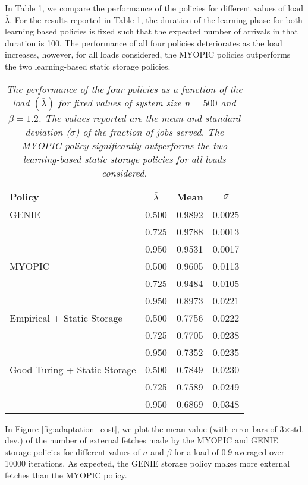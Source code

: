 \documentclass[10pt, conference, letterpaper]{IEEEtran}
\begin{document}
In Table \ref{table:diff_load}, we compare the performance of the policies for different values of load $\bar{\lambda}$. For the results reported in Table \ref{table:diff_load}, the duration of the learning phase for both learning based policies is fixed such that the expected number of arrivals in that duration is 100. The performance of all four policies deteriorates as the load increases, however, for all loads considered, the MYOPIC policies outperforms the two learning-based static storage policies.

\begin{table}[h]
	\centering
	\begin{tabular}{l c c c }
		\hline\hline
		Policy & $\bar{\lambda}$ & Mean & $\sigma$ \\ [0.5ex] \hline GENIE & 0.500 & 0.9892 & 0.0025 \\
		& 0.725 & 0.9788 & 0.0013 \\
		& 0.950 & 0.9531 & 0.0017 \\
		\hline
		MYOPIC & 0.500 & 0.9605 & 0.0113 \\
		& 0.725 & 0.9484 & 0.0105 \\
		& 0.950 & 0.8973 & 0.0221 \\
		\hline
		Empirical + Static Storage & 0.500 & 0.7756 & 0.0222  \\
		& 0.725 & 0.7705 & 0.0238 \\
		& 0.950 & 0.7352 & 0.0235 \\
		\hline
		Good Turing + Static Storage & 0.500 & 0.7849 & 0.0230  \\
		& 0.725 & 0.7589 & 0.0249 \\
		& 0.950 & 0.6869 & 0.0348 \\
		\hline
	\end{tabular}
	\caption{\sl The performance of the four policies as a function of the load $(\bar{\lambda})$ for fixed values of system size $n = 500$ and $\beta = 1.2$. The values reported are the mean and standard deviation ($\sigma$) of the fraction of jobs served. The MYOPIC policy significantly outperforms the two learning-based static storage policies for all loads considered.}
	
	\label{table:diff_load} \end{table}


In Figure \ref{fig:adaptation_cost}, we plot the mean value (with error bars of 3$\times$std. dev.) of the number of external fetches made by the MYOPIC and GENIE storage policies for different values of $n$ and $\beta$ for a load of 0.9 averaged over 10000 iterations. As expected, the GENIE storage policy makes more external fetches than the MYOPIC policy.
\end{document}
